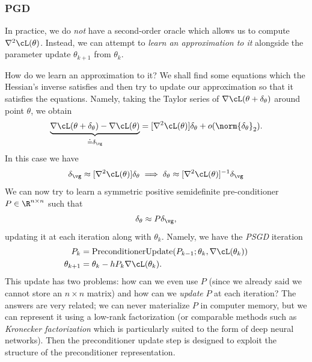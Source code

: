 \documentclass[../../book-main.tex]{subfiles}
\begin{document}
\subsubsection{PGD}

In practice, we do \textit{not} have a second-order oracle which
allows us to compute \(\nabla^{2}\cL(\theta)\). Instead, we can
attempt to \textit{learn an approximation to it} alongside the
parameter update \(\theta_{k + 1}\) from \(\theta_{k}\).

How do we learn an approximation to it? We shall find some equations
which the Hessian's inverse satisfies and then try to update our
approximation so that it satisfies the equations. Namely, taking the
Taylor series of \(\nabla \cL(\theta + \delta_{\theta})\) around
point \(\theta\), we obtain
\begin{equation}
    \underbrace{\nabla \cL(\theta + \delta_{\theta}) - \nabla
    \cL(\theta)}_{\doteq \delta_{\vg}} = [\nabla^{2}
    \cL(\theta)]\delta_{\theta} + o(\norm{\delta_{\theta}}_{2}).
\end{equation}
In this case we have
\begin{equation}
    \delta_{\vg} \approx [\nabla^{2}\cL(\theta)]\delta_{\theta}
    \implies \delta_{\theta} \approx [\nabla^{2}\cL(\theta)]^{-1}\delta_{\vg}
\end{equation}
We can now try to learn a symmetric positive semidefinite
pre-conditioner \(P \in \R^{n \times n}\) such that
\begin{equation}
    \delta_{\theta} \approx P\delta_{\vg},
\end{equation}
updating it at each iteration along with \(\theta_{k}\). Namely, we
have the \textit{PSGD} iteration
\begin{align}
    P_{k}
    &= \mathrm{PreconditionerUpdate}(P_{k - 1}; \theta_{k}, \nabla
    \cL(\theta_{k})) \\
    \theta_{k + 1}
    &= \theta_{k} - hP_{k}\nabla \cL(\theta_{k}).
\end{align}
This update has two problems: how can we even use \(P\) (since we
already said we cannot store an \(n \times n\) matrix) and how can we
\textit{update} \(P\) at each iteration? The answers are very
related; we can never materialize \(P\) in computer memory, but we
can represent it using a low-rank factorization (or comparable
    methods such as \textit{Kronecker factorization} which is
particularly suited to the form of deep neural networks). Then the
preconditioner update step is designed to exploit the structure of
the preconditioner representation.
\end{document}
